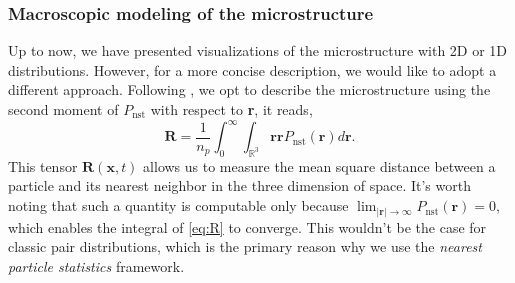\subsubsection*{Macroscopic modeling of the microstructure}
Up to now, we have presented visualizations of the microstructure with 2D or 1D distributions. 
However, for a more concise description, we would like to adopt a different approach. 
Following \citet{zhang2023evolution}, we opt to describe the microstructure using the second moment of $P_\text{nst}$ with respect to \textbf{r}, it reads,
\begin{equation}
    \textbf{R} =\frac{1}{n_p} 
    \int_0^\infty 
    \int_{\mathbb{R}^3} \textbf{rr} P_\text{nst}(\textbf{r}) d\textbf{r}.
    \label{eq:R}
\end{equation}
This tensor $\textbf{R}(\textbf{x},t)$ allows us to measure the mean square distance between a particle and its nearest neighbor in the three dimension of space.
It's worth noting that such a quantity is computable only because $\lim_{|\textbf{r}|\to \infty} P_\text{nst}(\textbf{r}) = 0$, which enables the integral of \ref{eq:R} to converge. 
This wouldn't be the case for classic pair distributions, which is the primary reason why we use the \textit{nearest particle statistics} framework. 

